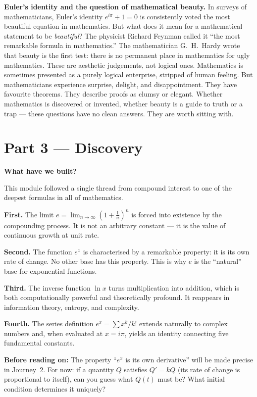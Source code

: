 \documentclass[12pt, a4paper]{article}
\begin{document}
\begin{thought}
\textbf{Euler's identity and the question of mathematical beauty.}
In surveys of mathematicians, Euler's identity $e^{i\pi} + 1 = 0$ is consistently voted the most beautiful equation in mathematics. But what does it mean for a mathematical statement to be \emph{beautiful}? The physicist Richard Feynman called it ``the most remarkable formula in mathematics.'' The mathematician G.~H.\ Hardy wrote that beauty is the first test: there is no permanent place in mathematics for ugly mathematics. These are aesthetic judgements, not logical ones. Mathematics is sometimes presented as a purely logical enterprise, stripped of human feeling. But mathematicians experience surprise, delight, and disappointment. They have favourite theorems. They describe proofs as clumsy or elegant. Whether mathematics is discovered or invented, whether beauty is a guide to truth or a trap --- these questions have no clean answers. They are worth sitting with.
\end{thought}

\section{Part 3 \texorpdfstring{---}{--} Discovery}

\begin{discoverybox}
\textbf{What have we built?}

This module followed a single thread from compound interest to one of the deepest formulas in all of mathematics.

\medskip
\textbf{First.} The limit $e = \lim_{n\to\infty}\left(1 + \tfrac{1}{n}\right)^n$ is forced into existence by the compounding process. It is not an arbitrary constant --- it is the value of continuous growth at unit rate.

\medskip
\textbf{Second.} The function $e^x$ is characterised by a remarkable property: it is its own rate of change. No other base has this property. This is why $e$ is the ``natural'' base for exponential functions.

\medskip
\textbf{Third.} The inverse function $\ln x$ turns multiplication into addition, which is both computationally powerful and theoretically profound. It reappears in information theory, entropy, and complexity.

\medskip
\textbf{Fourth.} The series definition $e^x = \sum x^k/k!$ extends naturally to complex numbers and, when evaluated at $x = i\pi$, yields an identity connecting five fundamental constants.

\medskip
\textbf{Before reading on:} The property ``$e^x$ is its own derivative'' will be made precise in Journey~2. For now: if a quantity $Q$ satisfies $Q' = kQ$ (its rate of change is proportional to itself), can you guess what $Q(t)$ must be? What initial condition determines it uniquely?
\end{discoverybox}
\end{document}
